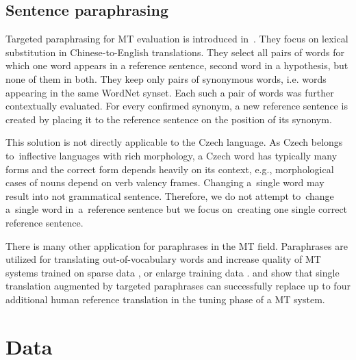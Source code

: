 \documentclass[11pt]{article}
\def \xxx#1{\textbf{\textcolor{red}{xxx: #1}}}
\begin{document}

\subsection{Sentence paraphrasing}
Targeted paraphrasing for MT evaluation is introduced in~. 
They focus on lexical substitution in Chinese-to-English translations. They 
select all pairs of words for which one word appears in a reference sentence, 
second word in a hypothesis, but none of them in both. They keep only 
pairs of synonymous words, i.e. words appearing in the same WordNet 
\cite{wordnet} synset. Each such a pair of words was further contextually 
evaluated. For every confirmed synonym, a new reference sentence is created by 
placing it to the reference sentence on the position of its synonym.

This solution is not directly applicable to the Czech language. As Czech 
belongs to~inflective languages with rich morphology, a Czech word has 
typically many forms and the correct form depends heavily on its context, 
e.g., morphological cases of nouns depend on verb valency frames. Changing 
a~single word may result into not grammatical sentence. Therefore, we do not 
attempt to~change a~single word in~a~reference sentence but we focus 
on~creating one single correct reference sentence.

There is many other application for paraphrases in the MT field. Paraphrases 
are utilized for translating out-of-vocabulary words and increase quality of MT 
systems trained on sparse data \cite{Callison-Burch:2006}, \cite{Marton:2009} or 
enlarge training data \cite{nakov2008improved}.
 and  show that single 
translation augmented by targeted paraphrases can successfully replace up to
four additional human reference translation in the tuning phase of a MT system.
 

\section{Data}
\label{Data}
\end{document}
